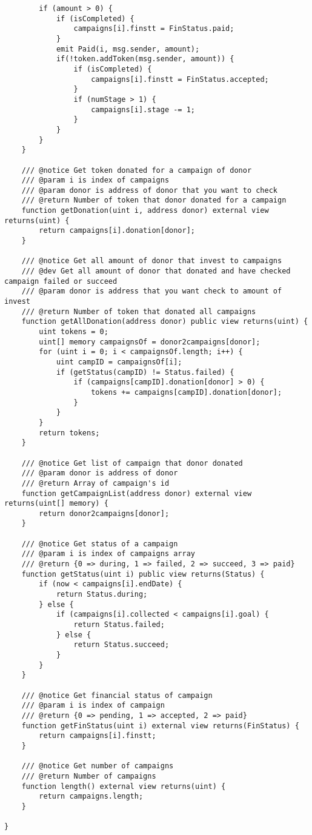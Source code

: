 \documentclass[../main-report.tex]{subfiles}
\begin{document}
\begin{lstlisting}
        if (amount > 0) {
            if (isCompleted) {
                campaigns[i].finstt = FinStatus.paid;
            }
            emit Paid(i, msg.sender, amount);
            if(!token.addToken(msg.sender, amount)) {
                if (isCompleted) {
                    campaigns[i].finstt = FinStatus.accepted;
                }
                if (numStage > 1) {
                    campaigns[i].stage -= 1;
                }
            }
        }
    }

    /// @notice Get token donated for a campaign of donor
    /// @param i is index of campaigns
    /// @param donor is address of donor that you want to check
    /// @return Number of token that donor donated for a campaign
    function getDonation(uint i, address donor) external view returns(uint) {
        return campaigns[i].donation[donor];
    }

    /// @notice Get all amount of donor that invest to campaigns
    /// @dev Get all amount of donor that donated and have checked campaign failed or succeed
    /// @param donor is address that you want check to amount of invest
    /// @return Number of token that donated all campaigns
    function getAllDonation(address donor) public view returns(uint) {
        uint tokens = 0;
        uint[] memory campaignsOf = donor2campaigns[donor];
        for (uint i = 0; i < campaignsOf.length; i++) {
            uint campID = campaignsOf[i];
            if (getStatus(campID) != Status.failed) {
                if (campaigns[campID].donation[donor] > 0) {
                    tokens += campaigns[campID].donation[donor];
                }
            }
        }
        return tokens;
    }

    /// @notice Get list of campaign that donor donated
    /// @param donor is address of donor
    /// @return Array of campaign's id
    function getCampaignList(address donor) external view returns(uint[] memory) {
        return donor2campaigns[donor];
    }

    /// @notice Get status of a campaign
    /// @param i is index of campaigns array
    /// @return {0 => during, 1 => failed, 2 => succeed, 3 => paid}
    function getStatus(uint i) public view returns(Status) {
        if (now < campaigns[i].endDate) {
            return Status.during;
        } else {
            if (campaigns[i].collected < campaigns[i].goal) {
                return Status.failed;
            } else {
                return Status.succeed;
            }
        }
    }

    /// @notice Get financial status of campaign
    /// @param i is index of campaign
    /// @return {0 => pending, 1 => accepted, 2 => paid}
    function getFinStatus(uint i) external view returns(FinStatus) {
        return campaigns[i].finstt;
    }

    /// @notice Get number of campaigns
    /// @return Number of campaigns
    function length() external view returns(uint) {
        return campaigns.length;
    }

}
\end{lstlisting}
\end{document}
